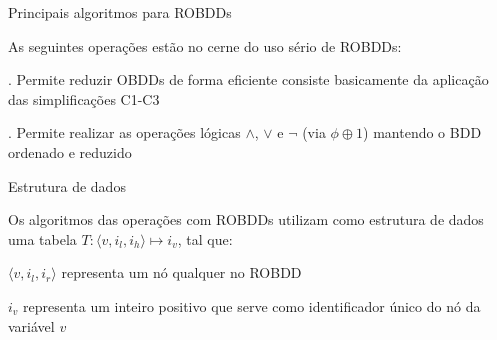 \expandafter\documentclass\expandafter[table, usenames, svgnames, dvipsnames,14pt, \classopts]{beamer}
\begin{document}
\begin{frame}{Principais algoritmos para ROBDDs}

    As seguintes operações estão no cerne do uso sério de ROBDDs:
    
    \begin{outline}
        \1 . Permite reduzir OBDDs de forma eficiente
            \2[-] consiste basicamente da aplicação das simplificações C1-C3
            
        \1 . Permite realizar as operações lógicas $\land$, $\lor$ e $\lnot$ (via $\phi \oplus 1$)
            \2[-] mantendo o BDD ordenado e reduzido
    \end{outline}

\end{frame}

\begin{frame}{Estrutura de dados}

    Os algoritmos das operações com ROBDDs utilizam como estrutura de dados uma tabela $T: \langle v,i_l,i_h \rangle \mapsto i_v$, tal que:

    \small
    \begin{outline}
        \1 $\langle v,i_l,i_r \rangle$ representa um nó qualquer no ROBDD
            
        \vspace{1em}
            
        \1 $i_v$ representa um inteiro positivo que serve como identificador único do nó da variável $v$
    \end{outline}

\end{frame}
\end{document}
